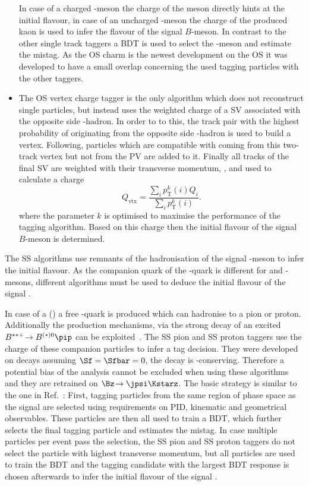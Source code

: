 \begin{itemize}
	In case of a charged \D-meson the charge of the meson directly hints at the initial flavour, in case of an uncharged \D-meson the charge of the produced kaon is used to infer the flavour of the signal $B$-meson.
	In contrast to the other single track taggers a \ac{BDT} is used to select the \D-meson and estimate the mistag.
	As the OS charm is the newest development on the OS it was developed to have a small overlap concerning the used tagging particles with the other taggers.
	\item The OS vertex charge tagger is the only algorithm which does not reconstruct single particles, but instead uses the weighted charge of a \ac{SV} associated with the opposite side \bquark-hadron.
	In order to to this, the track pair with the highest probability of originating from the opposite side \bquark-hadron is used to build a vertex.
	Following, particles which are compatible with coming from this two-track vertex but not from the \ac{PV} are added to it.
	Finally all tracks of the final \ac{SV} are weighted with their transverse momentum, \pt, and used to calculate a charge
	\begin{equation}
	Q_{\text{vtx}}=\frac{\sum_{i}p_{\mathrm T}^k(i)Q_i}{\sum_{i}p_{\mathrm T}^k(i)}.
	\end{equation}
	where the parameter $k$ is optimised to maximise the performance of the tagging algorithm.
	Based on this charge then the initial flavour of the signal $B$-meson is determined.
\end{itemize}

The SS algorithms use remnants of the hadronisation of the signal \B-meson to infer the initial flavour.
As the companion quark of the \bquark-quark is different for \Bz and \Bs-mesons, different algorithms must be used to deduce the initial flavour of the signal \B.

In case of a \Bz (\bquarkbar\dquark) a free \dquarkbar-quark is produced which can hadronise to a pion or proton.
Additionally the production mechanisms, \eg via the strong decay of an excited $B^{**+}\!\to B^{(*)0}\pip$ can be exploited~\cite{Aaij:2016rdg}.
The SS pion and SS proton taggers use the charge of these companion particles to infer a tag decision.
They were developed on \BdToDpi decays assuming $\Sf=\Sfbar=0$, \ie the decay \BdToDpi is \CP-conserving.
Therefore a potential bias of the analysis cannot be excluded when using these algorithms and they are retrained on $\Bz\!\to\jpsi\Kstarz$.
The basic strategy is similar to the one in Ref.~\cite{Aaij:2016rdg}:
First, tagging particles from the same region of phase space as the signal \B are selected using requirements on PID, kinematic and geometrical observables.
These particles are then all used to train a \ac{BDT}, which further selects the final tagging particle and estimates the mistag.
In case multiple particles per event pass the selection, the SS pion and SS proton taggers do not select the particle with highest transverse momentum, but all particles are used to train the \ac{BDT} and the tagging candidate with the largest \ac{BDT} response is chosen afterwards to infer the initial flavour of the signal \B.

